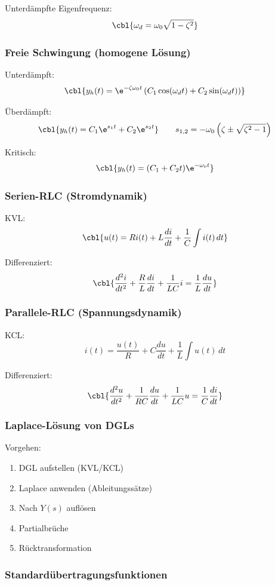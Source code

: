 Unterdämpfte Eigenfrequenz:
\[
\cbl{\omega_d = \omega_0\sqrt{1-\zeta^2}}
\]

\subsubsection{Freie Schwingung (homogene Lösung)}

Unterdämpft:
\[
\cbl{y_h(t)=\e^{-\zeta\omega_0 t}\left(C_1\cos(\omega_d t)+C_2\sin(\omega_d t)\right)}
\]

Überdämpft:
\[
\cbl{y_h(t)=C_1\e^{s_1 t}+C_2\e^{s_2 t}}
\qquad
s_{1,2}=-\omega_0\left(\zeta\pm\sqrt{\zeta^2-1}\right)
\]

Kritisch:
\[
\cbl{y_h(t)=(C_1 + C_2 t)\e^{-\omega_0 t}}
\]

\subsubsection{Serien-RLC (Stromdynamik)}

KVL:
\[
\cbl{u(t)=Ri(t)+L\frac{di}{dt}+\frac{1}{C}\int i(t)\,dt}
\]

Differenziert:
\[
\cbl{\frac{d^2 i}{dt^2} + \frac{R}{L}\frac{di}{dt} + \frac{1}{LC}i = \frac{1}{L}\frac{du}{dt}}
\]

\subsubsection{Parallele-RLC (Spannungsdynamik)}

KCL:
\[
i(t)=\frac{u(t)}{R}+C\frac{du}{dt}+\frac{1}{L}\int u(t)\,dt
\]

Differenziert:
\[
\cbl{\frac{d^2 u}{dt^2} + \frac{1}{RC}\frac{du}{dt} + \frac{1}{LC}u = \frac{1}{C}\frac{di}{dt}}
\]

\subsubsection{Laplace-Lösung von DGLs}

Vorgehen:
\begin{enumerate}
    \item DGL aufstellen (KVL/KCL)
    \item Laplace anwenden (Ableitungssätze)
    \item Nach $Y(s)$ auflösen
    \item Partialbrüche
    \item Rücktransformation
\end{enumerate}

\subsubsection{Standardübertragungsfunktionen}

